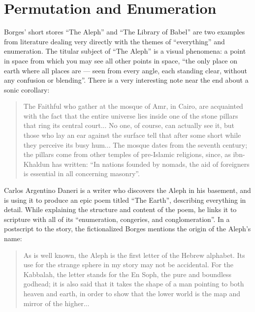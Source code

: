 \documentclass{thesis}
\begin{document}
\section{Permutation and Enumeration}
	Borges' short stores ``The Aleph''\cite{borges_aleph_2004} and ``The Library of Babel''\cite{borges_library_2000} are two examples from literature dealing very directly with the themes of ``everything'' and enumeration. The titular subject of ``The Aleph'' is a visual phenomena: a point in space from which you may see all other points in space, ``the only place on earth where all places are --- seen from every angle, each standing clear, without any confusion or blending''. There is a very interesting note near the end about a sonic corollary:
	
	\begin{quote}
	The Faithful who gather at the mosque of Amr, in Cairo, are acquainted with the fact that the entire universe lies inside one of the stone pillars that ring its central court... No one, of course, can actually see it, but those who lay an ear against the surface tell that after some short while they perceive its busy hum... The mosque dates from the seventh century; the pillars come from other temples of pre-Islamic religions, since, as ibn-Khaldun has written: ``In nations founded by nomads, the aid of foreigners is essential in all concerning masonry''.
	\end{quote}
	
	Carlos Argentino Daneri is a writer who discovers the Aleph in his basement, and is using it to produce an epic poem titled ``The Earth'', describing everything in detail. While explaining the structure and content of the poem, he links it to scripture with all of its ``enumeration, congeries, and conglomeration''. In a postscript to the story, the fictionalized Borges mentions the origin of the Aleph's name:
	
	\begin{quote}
	As is well known, the Aleph is the first letter of the Hebrew alphabet. Its use for the strange sphere in my story may not be accidental. For the Kabbalah, the letter stands for the En Soph, the pure and boundless godhead; it is also said that it takes the shape of a man pointing to both heaven and earth, in order to show that the lower world is the map and mirror of the higher...
	\end{quote}
	
\end{document}
